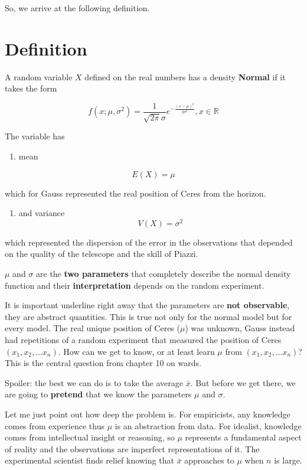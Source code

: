 \documentclass[
]{book}
\providecommand{\tightlist}{%
  \setlength{\itemsep}{0pt}\setlength{\parskip}{0pt}}
\begin{document}
So, we arrive at the following definition.

\hypertarget{definition}{%
\section{Definition}\label{definition}}

A random variable \(X\) defined on the real numbers has a density \textbf{Normal} if it takes the form

\[f(x; \mu, \sigma^2)=\frac{1}{\sqrt{2\pi}\sigma}e^{-\frac{(x-\mu)^2}{2\sigma^2}}, x \in {\mathbb R}\]

The variable has

\begin{enumerate}
\def\labelenumi{\arabic{enumi})}
\tightlist
\item
  mean
\end{enumerate}

\[E(X) = \mu\]

which for Gauss represented the real position of Ceres from the horizon.

\begin{enumerate}
\def\labelenumi{\arabic{enumi})}
\setcounter{enumi}{1}
\tightlist
\item
  and variance
  \[V(X) = \sigma^2\]
\end{enumerate}

which represented the dispersion of the error in the observations that depended on the quality of the telescope and the skill of Piazzi.

\(\mu\) and \(\sigma\) are the \textbf{two parameters} that completely describe the normal density function and their \textbf{interpretation} depends on the random experiment.

It is important underline right away that the parameters are \textbf{not observable}, they are abstract quantities. This is true not only for the normal model but for every model. The real unique position of Ceres (\(\mu\)) was unknown, Gauss instead had repetitions of a random experiment that measured the position of Ceres \((x_1, x_2, ...x_n)\). How can we get to know, or at least learn \(\mu\) from \((x_1, x_2, ...x_n)\)? This is the central question from chapter 10 on wards.

Spoiler: the best we can do is to take the average \(\bar{x}\). But before we get there, we are going to \textbf{pretend} that we know the parameters \(\mu\) and \(\sigma\).

Let me just point out how deep the problem is. For empiricists, any knowledge comes from experience thus \(\mu\) is an abstraction from data. For idealist, knowledge comes from intellectual insight or reasoning, so \(\mu\) represents a fundamental aspect of reality and the observations are imperfect representations of it. The experimental scientist finds relief knowing that \(\bar{x}\) approaches to \(\mu\) when \(n\) is large.
\end{document}
